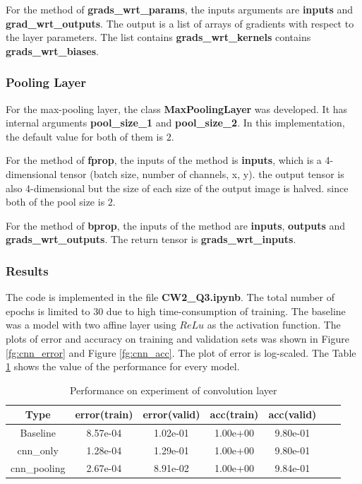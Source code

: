 \documentclass[11pt]{article}
\begin{document}
For the method of {\bf grads\_wrt\_params}, the inputs arguments are {\bf inputs} and {\bf grad\_wrt\_outputs}. The output is a list of arrays of gradients with respect to the layer parameters. The list contains  {\bf grads\_wrt\_kernels} contains {\bf grads\_wrt\_biases}.

\subsubsection{Pooling Layer}
For the max-pooling layer, the class {\bf MaxPoolingLayer} was developed. It has internal arguments {\bf pool\_size\_1} and {\bf pool\_size\_2}. In this implementation, the default value for both of them is $2$.

For the method of {\bf fprop}, the inputs of the method is {\bf inputs}, which is a 4-dimensional tensor (batch size, number of channels, x, y). the output tensor is also 4-dimensional but the size of each size of the output image is halved. since both of the pool size is $2$.

For the method of {\bf bprop}, the inputs of the method  are {\bf inputs}, {\bf outputs} and {\bf grads\_wrt\_outputs}. The return tensor is {\bf grads\_wrt\_inputs}.

\subsubsection{Results}

The code is implemented in the file {\bf CW2\_Q3.ipynb}. The total number of epochs is limited to $30$ due to high time-consumption of training. The baseline was a model with two affine layer using $ReLu$ as the activation function. The plots of error and accuracy on training and validation sets was shown in Figure \ref{fg:cnn_error} and Figure \ref{fg:cnn_acc}. The plot of error is log-scaled. The Table \ref{tb:cnn} shows the value of the performance for every model. 

\begin{table}[htp]
\begin{center}
\begin{tabular}{ c c c c c  c c} 
\hline
Type &error(train) & error(valid) & acc(train) & acc(valid) \\
\hline
\hline
Baseline & 8.57e-04 & 1.02e-01 & 1.00e+00 &9.80e-01 \\
cnn\_only	&1.28e-04 & 1.29e-01 & 1.00e+00 & 9.80e-01 \\ 
cnn\_pooling &2.67e-04 & 8.91e-02 & 1.00e+00 & 9.84e-01 \\ 
\end{tabular}
\caption{Performance on experiment of convolution layer }
\label{tb:cnn}
\end{center}	
\end{table}
\end{document}
